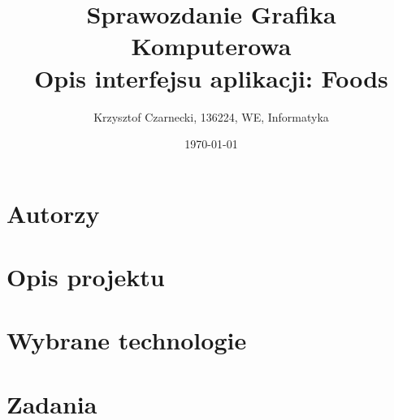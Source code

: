 \documentclass[12pt,a4paper]{article}
\begin{document}
\title{Sprawozdanie Grafika Komputerowa\\Opis interfejsu aplikacji: Foods}
\author{Krzysztof Czarnecki, 136224, WE, Informatyka}
\date{\today}

\maketitle

\tableofcontents

\section{Autorzy}


\section{Opis projektu}


\section{Wybrane technologie}


\section{Zadania}



\end{document}
